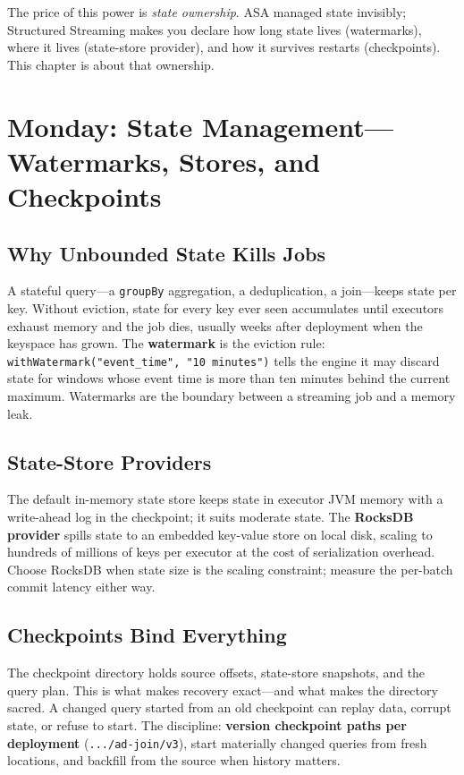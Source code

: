 The price of this power is \emph{state ownership}. ASA managed state invisibly; Structured Streaming makes you declare how long state lives (watermarks), where it lives (state-store provider), and how it survives restarts (checkpoints). This chapter is about that ownership.

\section{Monday: State Management---Watermarks, Stores, and Checkpoints}

\subsection{Why Unbounded State Kills Jobs}
A stateful query---a \texttt{groupBy} aggregation, a deduplication, a join---keeps state per key. Without eviction, state for every key ever seen accumulates until executors exhaust memory and the job dies, usually weeks after deployment when the keyspace has grown. The \textbf{watermark} is the eviction rule: \texttt{withWatermark("event\_time", "10 minutes")} tells the engine it may discard state for windows whose event time is more than ten minutes behind the current maximum. Watermarks are the boundary between a streaming job and a memory leak.

\subsection{State-Store Providers}
The default in-memory state store keeps state in executor JVM memory with a write-ahead log in the checkpoint; it suits moderate state. The \textbf{RocksDB provider} spills state to an embedded key-value store on local disk, scaling to hundreds of millions of keys per executor at the cost of serialization overhead. Choose RocksDB when state size is the scaling constraint; measure the per-batch commit latency either way.

\subsection{Checkpoints Bind Everything}
The checkpoint directory holds source offsets, state-store snapshots, and the query plan. This is what makes recovery exact---and what makes the directory sacred. A changed query started from an old checkpoint can replay data, corrupt state, or refuse to start. The discipline: \textbf{version checkpoint paths per deployment} (\texttt{.../ad-join/v3}), start materially changed queries from fresh locations, and backfill from the source when history matters.

